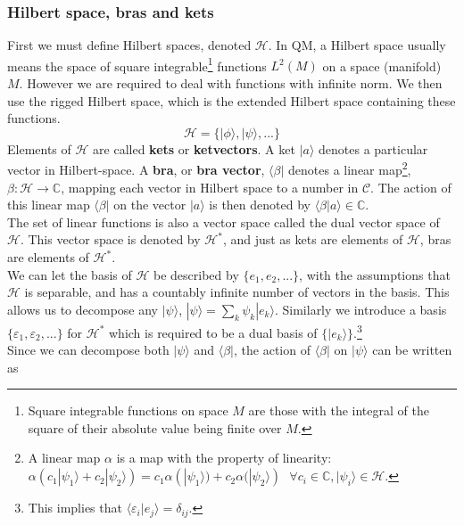 \documentclass{article}
\begin{document}
\subsubsection{Hilbert space, bras and kets}
First we must define Hilbert spaces, denoted $\mathcal{H	}$. In QM, a Hilbert space usually means the space of square integrable\footnote{Square integrable functions on space $M$ are those with the integral of the square of their absolute value being finite over $M$.} functions $L^2(M)$ on a space (manifold) $M$. However we are required to deal with functions with infinite norm. We then use the rigged Hilbert space, which is the extended Hilbert space containing these functions.
\begin{equation}
\mathcal{H}=\lbrace |\phi \rangle, |\psi\rangle, ...\rbrace
\end{equation}
Elements of $\mathcal{H}$ are called \textbf{kets} or \textbf{ketvectors}. A ket $|a\rangle$ denotes a particular vector in Hilbert-space. A \textbf{bra}, or \textbf{bra vector}, $\langle \beta|$ denotes a linear map\footnote{A linear map $\alpha$ is a map with the property of linearity:
$\alpha(c_1|\psi_1\rangle + c_2|\psi_2\rangle) = c_1\alpha(|\psi_1\rangle)+c_2\alpha(|\psi_2\rangle) ~~~\forall c_i\in \mathbb{C}, |\psi_i\rangle\in \mathcal{H}.$}, $\beta : \mathcal{H}\rightarrow \mathbb{C}$, mapping each vector in Hilbert space to a number in $\mathcal{C}$. The action of this linear map $\langle \beta |$ on the vector $|a\rangle$ is then denoted by $\langle\beta|a\rangle\in \mathbb{C}$.\\
\indent The set of linear functions is also a vector space called the dual vector space of $\mathcal{H}$. This vector space is denoted by $\mathcal{H}^*$, and just as kets are elements of $\mathcal{H}$, bras are elements of $\mathcal{H}^*$.\\
\indent We can let the basis of $\mathcal{H}$ be described by $\lbrace e_1,e_2,...\rbrace$, with the assumptions that $\mathcal{H}$ is separable, and has a countably infinite number of vectors in the basis. This allows us to decompose any $|\psi\rangle$, $|\psi\rangle=\sum_k\psi_k|e_k\rangle$. Similarly we introduce a basis $\lbrace \varepsilon_1, \varepsilon_2, ...\rbrace$ for $\mathcal{H}^*$ which is required to be a dual basis of $\lbrace|e_k\rangle\rbrace$.\footnote{This implies that $\langle\varepsilon_i|e_j\rangle=\delta_{ij}$.}\\
\indent Since we can decompose both $|\psi\rangle$ and $\langle \beta|$, the action of $\langle\beta|$ on $|\psi\rangle$ can be written as
\end{document}
